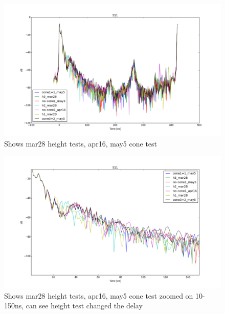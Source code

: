 \documentclass[preprint]{aastex}  %
\begin{document}
\begin{figure}[H]
	\begin{center}
	\includegraphics[width =\textwidth]{reflectometry_plots/configcompare}
	\caption{Shows mar28 height tests, apr16, may5 cone test
\label{Fig:} }
	\end{center}
\end{figure}
\begin{figure}[H]
	\begin{center}
	\includegraphics[width =\textwidth]{reflectometry_plots/configcompare10-150ns}
	\caption{Shows mar28 height tests, apr16, may5 cone test zoomed on 10-150ns, can see height test changed the delay
\label{Fig:} }
	\end{center}
\end{figure}
\end{document}
